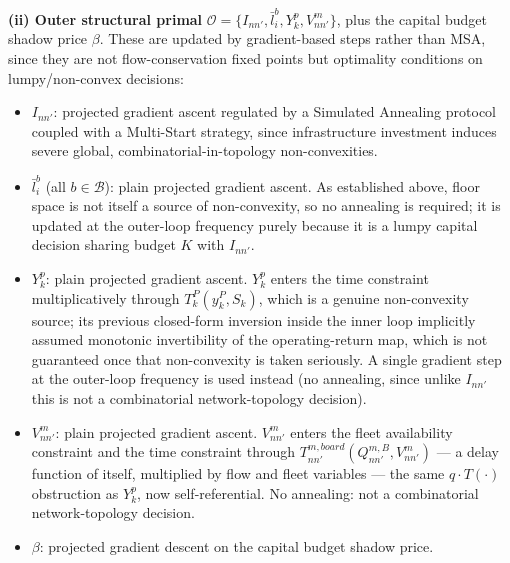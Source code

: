 \documentclass[11pt,a4paper]{article}
\begin{document}
\textbf{(ii) Outer structural primal} $\mathcal{O} = \{I_{nn'}, \bar l_i^b, Y_k^p, V_{nn'}^m\}$, plus the capital budget shadow price $\beta$. These are updated by gradient-based steps rather than MSA, since they are not flow-conservation fixed points but optimality conditions on lumpy/non-convex decisions:
\begin{itemize}[leftmargin=*]
    \item $I_{nn'}$: projected gradient ascent regulated by a Simulated Annealing protocol coupled with a Multi-Start strategy, since infrastructure investment induces severe global, combinatorial-in-topology non-convexities.
    \item $\bar l_i^b$ (all $b\in\mathcal{B}$): plain projected gradient ascent. As established above, floor space is not itself a source of non-convexity, so no annealing is required; it is updated at the outer-loop frequency purely because it is a lumpy capital decision sharing budget $K$ with $I_{nn'}$.
    \item $Y_k^p$: plain projected gradient ascent. $Y_k^p$ enters the time constraint multiplicatively through $T^P_k(y_k^P, S_k)$, which is a genuine non-convexity source; its previous closed-form inversion inside the inner loop implicitly assumed monotonic invertibility of the operating-return map, which is not guaranteed once that non-convexity is taken seriously. A single gradient step at the outer-loop frequency is used instead (no annealing, since unlike $I_{nn'}$ this is not a combinatorial network-topology decision).
    \item $V_{nn'}^m$: plain projected gradient ascent. $V^m_{nn'}$ enters the fleet availability constraint and the time constraint through $T^{m,board}_{nn'}(Q^{m,B}_{nn'}, V^m_{nn'})$ — a delay function of itself, multiplied by flow and fleet variables — the same $q\cdot T(\cdot)$ obstruction as $Y_k^p$, now self-referential. No annealing: not a combinatorial network-topology decision.
    \item $\beta$: projected gradient descent on the capital budget shadow price.
\end{itemize}
\end{document}
